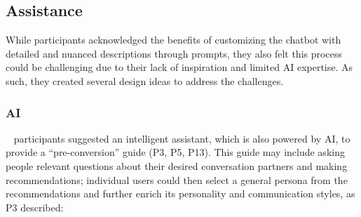 \subsection{ Assistance }
While participants acknowledged the benefits of customizing the chatbot with detailed and nuanced descriptions through prompts, they also felt this process could be challenging due to their lack of inspiration and limited AI expertise. As such, they created several design ideas to address the challenges.


\subsubsection{ AI}~\label{ai-assistant} 
 participants suggested an intelligent assistant, which is also powered by AI, to provide a ``pre-conversion'' guide (P3, P5, P13). This guide may include asking people relevant questions about their desired conversation partners and making recommendations; individual users could then select a general persona from the recommendations and further enrich its personality and communication styles, as P3 described: 

